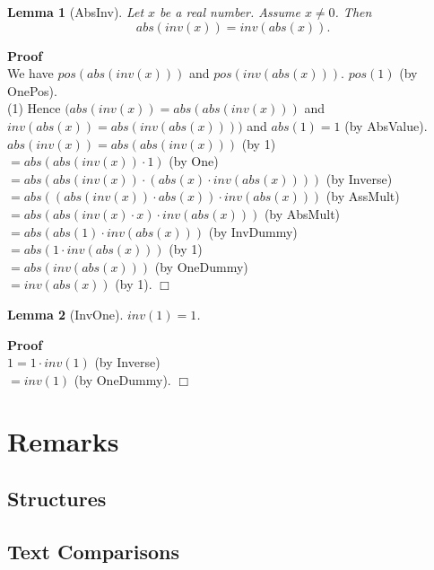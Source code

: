 \documentclass{article}
\newenvironment{forthel}{\begin{leftbar}}{\end{leftbar}}
\newenvironment{proof}{\noindent\textbf{Proof\ }}{\hspace*{\fill}$\Box$\medskip}
\newtheorem{lemma}{Lemma}
\newcommand{\dotequal}{=}
\begin{document}
\begin{forthel}
	
	
	\begin{lemma}[AbsInv]
	Let $x$ be a real number. Assume $x \neq 0$. Then $$abs(inv(x)) = inv(abs(x)).$$
	\end{lemma}
	\begin{proof} \\
	We have $pos(abs(inv(x)))$ and $pos(inv(abs(x)))$.
	$pos(1)$ (by OnePos).
	\\(1) Hence $( abs(inv(x)) = abs(abs(inv(x)))$ and $inv(abs(x)) = abs(inv(abs(x))) )$ and $abs(1) = 1$ (by AbsValue).
	\\$abs(inv(x)) \dotequal abs(abs(inv(x)))$ (by 1)
	\\$\dotequal abs(abs(inv(x)) \cdot 1)$ (by One)
	\\$\dotequal abs(abs(inv(x)) \cdot (abs(x) \cdot inv(abs(x))))$ (by Inverse)
	\\$\dotequal abs((abs(inv(x)) \cdot abs(x)) \cdot inv(abs(x)))$ (by AssMult)
	\\$\dotequal abs(abs(inv(x) \cdot x) \cdot inv(abs(x)))$ (by AbsMult)
	\\$\dotequal abs(abs(1) \cdot inv(abs(x)))$ (by InvDummy)
	\\$\dotequal abs(1 \cdot inv(abs(x)))$ (by 1) 
	\\$\dotequal abs(inv(abs(x)))$ (by OneDummy)
	\\$\dotequal inv(abs(x))$ (by 1).    
	\end{proof}
	
	
	\begin{lemma}[InvOne]
	$inv(1) = 1$.
	\end{lemma}
	\begin{proof}\\
	$1 \dotequal 1 \cdot inv(1)$ (by Inverse)
	\\$\dotequal inv(1)$ (by OneDummy).
	\end{proof}   
	
\end{forthel}


\section{Remarks}
\subsection{Structures}


\subsection{Text Comparisons}
\end{document}
